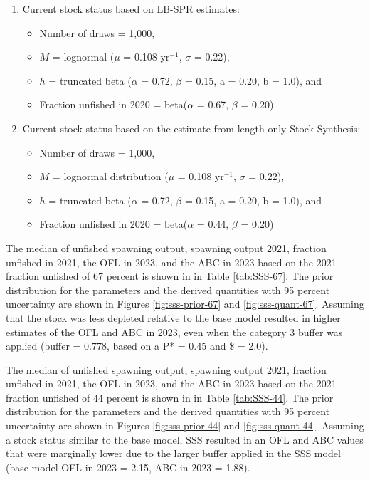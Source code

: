 \documentclass[11pt,
  english,
  a4paper,
]{article}
\begin{document}
\leavevmode\tagmcend\tagstructend\par

\begin{enumerate}  
    \item Current stock status based on LB-SPR estimates: 
        \begin{itemize}
        \item Number of draws = 1,000,
        \item $M$ = lognormal ($\mu$ = 0.108 yr$^{-1}$, $\sigma$ = 0.22),
        \item $h$ = truncated beta ($\alpha$ = 0.72, $\beta$ = 0.15, a = 0.20, b = 1.0), and
        \item Fraction unfished in 2020 = beta($\alpha$ = 0.67, $\beta$ = 0.20) 
    \end{itemize}
    \item Current stock status based on the estimate from length only Stock Synthesis:
    \begin{itemize}
        \item Number of draws = 1,000,
        \item $M$ = lognormal distribution ($\mu$ = 0.108 yr$^{-1}$, $\sigma$ = 0.22),
        \item $h$ = truncated beta ($\alpha$ = 0.72, $\beta$ = 0.15, a = 0.20, b = 1.0), and
        \item Fraction unfished in 2020 = beta($\alpha$ = 0.44, $\beta$ = 0.20)
    \end{itemize}   
\end{enumerate}


The median of unfished spawning output, spawning output 2021, fraction unfished in 2021, the OFL in 2023, and the ABC in 2023 based on the 2021 fraction unfished of 67 percent is shown in in Table \ref{tab:SSS-67}. The prior distribution for the parameters and the derived quantities with 95 percent uncertainty are shown in Figures \ref{fig:sss-prior-67} and \ref{fig:sss-quant-67}. Assuming that the stock was less depleted relative to the base model resulted in higher estimates of the OFL and ABC in 2023, even when the category 3 buffer was applied (buffer = 0.778, based on a P* = 0.45 and \$ = 2.0).

\leavevmode\tagmcend\tagstructend\par


The median of unfished spawning output, spawning output 2021, fraction unfished in 2021, the OFL in 2023, and the ABC in 2023 based on the 2021 fraction unfished of 44 percent is shown in in Table \ref{tab:SSS-44}. The prior distribution for the parameters and the derived quantities with 95 percent uncertainty are shown in Figures \ref{fig:sss-prior-44} and \ref{fig:sss-quant-44}. Assuming a stock status similar to the base model, SSS resulted in an OFL and ABC values that were marginally lower due to the larger buffer applied in the SSS model (base model OFL in 2023 = 2.15, ABC in 2023 = 1.88).
\end{document}
